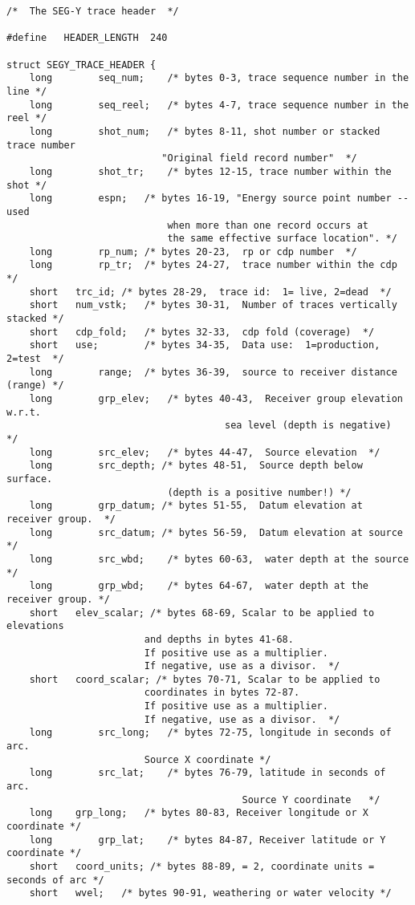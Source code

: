 \lstset{language=[ANSI]C}
\begin{lstlisting}[caption={segy\_header.h}]
/*  The SEG-Y trace header  */

#define   HEADER_LENGTH  240

struct SEGY_TRACE_HEADER {
	long		seq_num;	/* bytes 0-3, trace sequence number in the line */
	long		seq_reel;	/* bytes 4-7, trace sequence number in the reel */
	long		shot_num;	/* bytes 8-11, shot number or stacked trace number
						   "Original field record number"  */
	long		shot_tr;	/* bytes 12-15, trace number within the shot */
	long		espn;	/* bytes 16-19, "Energy source point number -- used
						    when more than one record occurs at
						    the same effective surface location". */
	long		rp_num;	/* bytes 20-23,  rp or cdp number  */
	long		rp_tr;	/* bytes 24-27,  trace number within the cdp */
	short	trc_id;	/* bytes 28-29,  trace id:  1= live, 2=dead  */
	short	num_vstk;	/* bytes 30-31,  Number of traces vertically stacked */
	short	cdp_fold;	/* bytes 32-33,  cdp fold (coverage)  */
	short	use;		/* bytes 34-35,  Data use:  1=production, 2=test  */
	long		range;	/* bytes 36-39,  source to receiver distance (range) */
	long		grp_elev;	/* bytes 40-43,  Receiver group elevation w.r.t.
					                  sea level (depth is negative)  */
	long		src_elev;	/* bytes 44-47,  Source elevation  */
	long		src_depth; /* bytes 48-51,  Source depth below surface.
							(depth is a positive number!) */
	long		grp_datum; /* bytes 51-55,  Datum elevation at receiver group.  */
	long		src_datum; /* bytes 56-59,  Datum elevation at source */
	long		src_wbd;	/* bytes 60-63,  water depth at the source */
	long		grp_wbd;	/* bytes 64-67,  water depth at the receiver group. */
	short	elev_scalar; /* bytes 68-69, Scalar to be applied to elevations
						and depths in bytes 41-68.
						If positive use as a multiplier.
						If negative, use as a divisor.  */
	short	coord_scalar; /* bytes 70-71, Scalar to be applied to
						coordinates in bytes 72-87.
						If positive use as a multiplier.
						If negative, use as a divisor.  */
	long		src_long;	/* bytes 72-75, longitude in seconds of arc.
						Source X coordinate */
	long		src_lat;	/* bytes 76-79, latitude in seconds of arc.
                                         Source Y coordinate   */
	long 	grp_long;	/* bytes 80-83, Receiver longitude or X coordinate */
	long		grp_lat;	/* bytes 84-87, Receiver latitude or Y coordinate */
	short	coord_units; /* bytes 88-89, = 2, coordinate units = seconds of arc */
	short	wvel;	/* bytes 90-91, weathering or water velocity */

\end{lstlisting}
